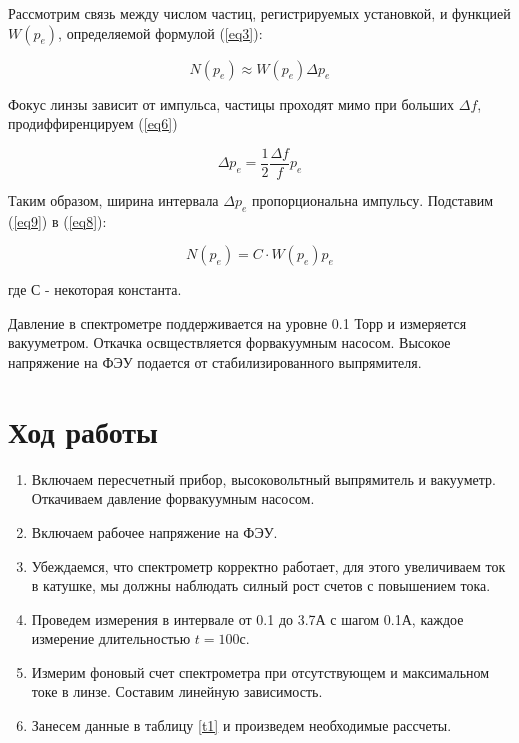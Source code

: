\documentclass[a4paper]{article}
\begin{document}
Рассмотрим связь между числом частиц, регистрируемых установкой, и функцией $W(p_e)$, 
определяемой формулой (\ref{eq3}):

\begin{equation}
    N(p_e) \approx W(p_e) \Delta p_e 
    \label{eq8}
\end{equation}

Фокус линзы зависит от импульса, частицы проходят мимо при больших $\Delta f$, 
продиффиренцируем (\ref{eq6})

\begin{equation}
    \Delta p_e = \frac{1}{2} \frac{\Delta f}{f} p_e
    \label{eq9}
\end{equation}

Таким образом, ширина интервала $\Delta p_e$ пропорциональна импульсу. Подставим 
(\ref{eq9}) в (\ref{eq8}):

\begin{equation}
    N(p_e) = C \cdot W(p_e) p_e
    \label{eq10}
\end{equation}

где С - некоторая константа.

Давление в спектрометре поддерживается на уровне 0.1 Торр и измеряется вакууметром.
Откачка освществляется форвакуумным насосом. Высокое напряжение на ФЭУ подается
от стабилизированного выпрямителя.


\section{Ход работы}

\begin{enumerate}
    \item Включаем пересчетный прибор, высоковольтный выпрямитель и вакууметр. Откачиваем давление форвакуумным насосом.
    \item Включаем рабочее напряжение на ФЭУ.
    \item Убеждаемся, что спектрометр корректно работает, для этого увеличиваем ток в катушке, мы должны наблюдать силный рост счетов с повышением тока.
    \item Проведем измерения в интервале от 0.1 до 3.7А с шагом 0.1А, каждое измерение длительностью $t = 100с$.
    \item Измерим фоновый счет спектрометра при отсутствующем и максимальном токе в линзе. Составим линейную зависимость.
    \item Занесем данные в таблицу \ref{t1} и произведем необходимые рассчеты.

\begin{center}
    
\end{center}

\end{enumerate}
\end{document}

